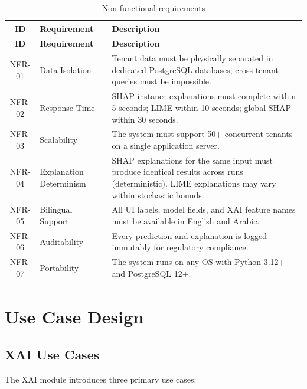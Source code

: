 \documentclass[12pt,a4paper]{report}
\begin{document}
\begin{longtable}{c p{3cm} p{8cm}}
\caption{Non-functional requirements} \label{tab:nonfunc_req} \\
\toprule
\textbf{ID} & \textbf{Requirement} & \textbf{Description} \\
\midrule
\endfirsthead
\toprule
\textbf{ID} & \textbf{Requirement} & \textbf{Description} \\
\midrule
\endhead
NFR-01 & Data Isolation & Tenant data must be physically separated in dedicated PostgreSQL databases; cross-tenant queries must be impossible. \\
NFR-02 & Response Time & SHAP instance explanations must complete within 5 seconds; LIME within 10 seconds; global SHAP within 30 seconds. \\
NFR-03 & Scalability & The system must support 50+ concurrent tenants on a single application server. \\
NFR-04 & Explanation Determinism & SHAP explanations for the same input must produce identical results across runs (deterministic). LIME explanations may vary within stochastic bounds. \\
NFR-05 & Bilingual Support & All UI labels, model fields, and XAI feature names must be available in English and Arabic. \\
NFR-06 & Auditability & Every prediction and explanation is logged immutably for regulatory compliance. \\
NFR-07 & Portability & The system runs on any OS with Python 3.12+ and PostgreSQL 12+. \\
\bottomrule
\end{longtable}

\section{Use Case Design}
\label{sec:use_cases}

\subsection{XAI Use Cases}

The XAI module introduces three primary use cases:
\end{document}
